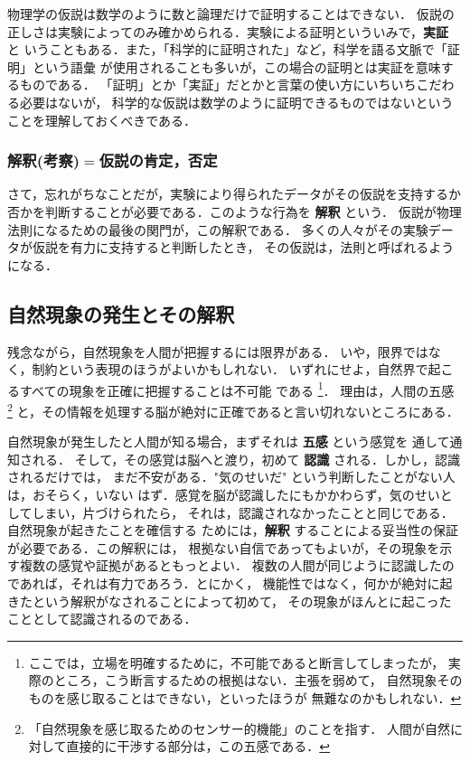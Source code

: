             物理学の仮説は数学のように数と論理だけで証明することはできない．
            仮説の正しさは実験によってのみ確かめられる．実験による証明といういみで，\textbf{実証} と
            いうこともある．また，「科学的に証明された」など，科学を語る文脈で「証明」という語彙
            が使用されることも多いが，この場合の証明とは実証を意味するものである．
            「証明」とか「実証」だとかと言葉の使い方にいちいちこだわる必要はないが，
            科学的な仮説は数学のように証明できるものではないということを理解しておくべきである．

        \subsubsection{解釈(考察)$=$仮説の肯定，否定}
            さて，忘れがちなことだが，実験により得られたデータがその仮説を支持するか
            否かを判断することが必要である．このような行為を \textbf{解釈} という．
            仮説が物理法則になるための最後の関門が，この解釈である．
            多くの人々がその実験データが仮説を有力に支持すると判断したとき，
            その仮説は，法則と呼ばれるようになる．

            \subsection{自然現象の発生とその解釈}
            残念ながら，自然現象を人間が把握するには限界がある．
            いや，限界ではなく，制約という表現のほうがよいかもしれない．
            いずれにせよ，自然界で起こるすべての現象を正確に把握することは不可能
            である
                \footnote{
                    ここでは，立場を明確するために，不可能であると断言してしまったが，
                    実際のところ，こう断言するための根拠はない．主張を弱めて，
                    自然現象そのものを感じ取ることはできない，といったほうが
                    無難なのかもしれない．
                }．
            理由は，人間の五感
                \footnote{
                    「自然現象を感じ取るためのセンサー的機能」のことを指す．
                    人間が自然に対して直接的に干渉する部分は，この五感である．
                }
            と，その情報を処理する脳が絶対に正確であると言い切れないところにある．

            自然現象が発生したと人間が知る場合，まずそれは \textbf{五感} という感覚を
            通して通知される．
            そして，その感覚は脳へと渡り，初めて \textbf{認識} される．しかし，認識されるだけでは，
            まだ不安がある．"気のせいだ" という判断したことがない人は，おそらく，いない
            はず．感覚を脳が認識したにもかかわらず，気のせいとしてしまい，片づけられたら，
            それは，認識されなかったことと同じである．自然現象が起きたことを確信する
            ためには，\textbf{解釈} することによる妥当性の保証が必要である．この解釈には，
            根拠ない自信であってもよいが，その現象を示す複数の感覚や証拠があるともっとよい．
            複数の人間が同じように認識したのであれば，それは有力であろう．とにかく，
            機能性ではなく，何かが絶対に起きたという解釈がなされることによって初めて，
            その現象がほんとに起こったこととして認識されるのである．

